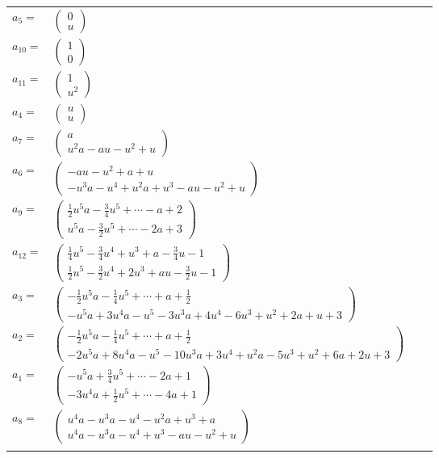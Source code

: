 \documentclass[1p]{elsarticle_modified}
\theoremstyle{definition}
\begin{document}
\begin{tabular}{m{7pt} m{180pt} m{7pt} m{180pt} }
\flushright $a_{5}=$&$\begin{pmatrix}0\\u\end{pmatrix}$ \\
\flushright $a_{10}=$&$\begin{pmatrix}1\\0\end{pmatrix}$ \\
\flushright $a_{11}=$&$\begin{pmatrix}1\\u^2\end{pmatrix}$ \\
\flushright $a_{4}=$&$\begin{pmatrix}u\\u\end{pmatrix}$ \\
\flushright $a_{7}=$&$\begin{pmatrix}a\\u^2 a- a u- u^2+u\end{pmatrix}$ \\
\flushright $a_{6}=$&$\begin{pmatrix}- a u- u^2+a+u\\- u^3 a- u^4+u^2 a+u^3- a u- u^2+u\end{pmatrix}$ \\
\flushright $a_{9}=$&$\begin{pmatrix}\frac{1}{2} u^5 a-\frac{3}{4} u^5+\cdots- a+2\\u^5 a-\frac{3}{2} u^5+\cdots-2 a+3\end{pmatrix}$ \\
\flushright $a_{12}=$&$\begin{pmatrix}\frac{1}{4} u^5-\frac{3}{4} u^4+u^3+a-\frac{3}{4} u-1\\\frac{1}{2} u^5-\frac{3}{2} u^4+2 u^3+a u-\frac{3}{2} u-1\end{pmatrix}$ \\
\flushright $a_{3}=$&$\begin{pmatrix}-\frac{1}{2} u^5 a-\frac{1}{4} u^5+\cdots+a+\frac{1}{2}\\- u^5 a+3 u^4 a- u^5-3 u^3 a+4 u^4-6 u^3+u^2+2 a+u+3\end{pmatrix}$ \\
\flushright $a_{2}=$&$\begin{pmatrix}-\frac{1}{2} u^5 a-\frac{1}{4} u^5+\cdots+a+\frac{1}{2}\\-2 u^5 a+8 u^4 a- u^5-10 u^3 a+3 u^4+u^2 a-5 u^3+u^2+6 a+2 u+3\end{pmatrix}$ \\
\flushright $a_{1}=$&$\begin{pmatrix}- u^5 a+\frac{3}{4} u^5+\cdots-2 a+1\\-3 u^4 a+\frac{1}{2} u^5+\cdots-4 a+1\end{pmatrix}$ \\
\flushright $a_{8}=$&$\begin{pmatrix}u^4 a- u^3 a- u^4- u^2 a+u^3+a\\u^4 a- u^3 a- u^4+u^3- a u- u^2+u\end{pmatrix}$\\&\end{tabular}
\end{document}
